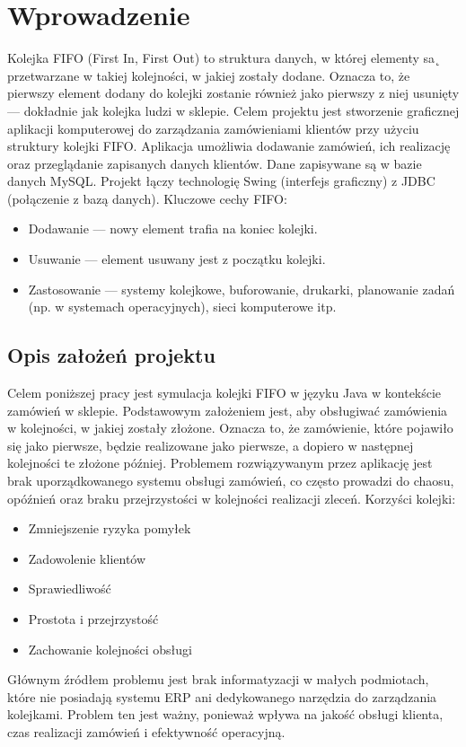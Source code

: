 \chapter{Wprowadzenie}
\label{cha:wprowadzenie}

Kolejka FIFO (First In, First Out) to struktura danych, w której elementy sa˛ przetwarzane w takiej
kolejności, w jakiej zostały dodane. Oznacza to, że pierwszy element dodany do kolejki zostanie również
jako pierwszy z niej usunięty — dokładnie jak kolejka ludzi w sklepie. Celem projektu jest stworzenie graficznej aplikacji komputerowej do zarządzania zamówieniami klientów przy użyciu struktury kolejki FIFO. Aplikacja umożliwia dodawanie zamówień, ich realizację oraz przeglądanie zapisanych danych klientów. Dane zapisywane są w bazie danych MySQL. Projekt łączy technologię Swing (interfejs graficzny) z JDBC (połączenie z bazą danych). Kluczowe cechy FIFO:
\begin{itemize}
	\item Dodawanie — nowy element trafia na koniec kolejki.
	\item Usuwanie — element usuwany jest z początku kolejki.
	\item Zastosowanie — systemy kolejkowe, buforowanie, drukarki, planowanie zadań (np. w systemach operacyjnych), sieci komputerowe itp.
\end{itemize}



\section{Opis założeń projektu}
\label{sec:Opis założeń projektu}

Celem poniższej pracy jest symulacja kolejki FIFO w języku Java w kontekście zamówień w sklepie. Podstawowym założeniem jest, aby obsługiwać zamówienia w kolejności, w jakiej zostały złożone. Oznacza to, że zamówienie, które pojawiło się jako pierwsze, będzie realizowane jako pierwsze, a dopiero w następnej kolejności te złożone później. Problemem rozwiązywanym przez aplikację jest brak uporządkowanego systemu obsługi zamówień, co często prowadzi do chaosu, opóźnień oraz braku przejrzystości w kolejności realizacji zleceń. Korzyści kolejki:
\begin{itemize}
	\item Zmniejszenie ryzyka pomyłek
	\item Zadowolenie klientów
	\item Sprawiedliwość
	\item Prostota i przejrzystość
	\item Zachowanie kolejności obsługi
\end{itemize} 
Głównym źródłem problemu jest brak informatyzacji w małych podmiotach, które nie posiadają systemu ERP ani dedykowanego narzędzia do zarządzania kolejkami. Problem ten jest ważny, ponieważ wpływa na jakość obsługi klienta, czas realizacji zamówień i efektywność operacyjną.

